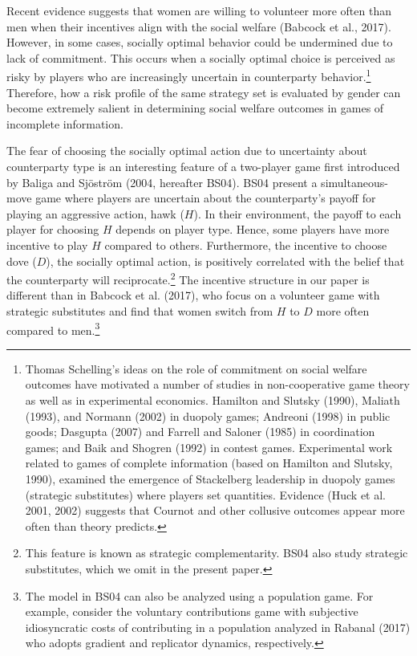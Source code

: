 \documentclass[12pt,english]{article}
\begin{document}
Recent evidence suggests that women are willing to volunteer more often than men when their incentives align with the social welfare (Babcock et al., 2017). However, in some cases, socially optimal behavior could be undermined due to lack of commitment. This occurs when a socially optimal choice is perceived as risky by players who are increasingly uncertain in counterparty behavior.\footnote{Thomas Schelling's ideas on the role of commitment on social welfare outcomes have motivated a number of studies in non-cooperative game theory as well as in experimental economics. Hamilton and Slutsky (1990), Maliath (1993), and Normann (2002) in duopoly games; Andreoni (1998) in public goods;  Dasgupta (2007) and Farrell and Saloner (1985) in coordination games; and Baik and Shogren (1992) in contest games. Experimental work related to games of complete information (based on Hamilton and Slutsky, 1990), examined the emergence of Stackelberg leadership in duopoly games (strategic substitutes) where players set quantities. Evidence (Huck et al. 2001, 2002) suggests that Cournot and other collusive outcomes appear more often than theory predicts.} Therefore, how a risk profile of the same strategy set is evaluated by gender can become extremely salient in determining social welfare outcomes in games of incomplete information.

The fear of choosing the socially optimal action due to uncertainty about counterparty type is an interesting feature of a two-player game first introduced by Baliga and Sj\"ostr\"om (2004, hereafter BS04). BS04 present a simultaneous-move game where players are uncertain about the counterparty's payoff for playing an aggressive action, hawk ($H$). In their environment, the payoff to each player for choosing $H$ depends on player type. Hence, some players have more incentive to play $H$ compared to others. Furthermore, the incentive to choose dove ($D$), the socially optimal action, is positively correlated with the belief that the counterparty will reciprocate.\footnote{This feature is known as strategic complementarity. BS04 also study strategic substitutes, which we omit in the present paper.} The incentive structure in our paper is different than in Babcock et al. (2017), who focus on a volunteer game with strategic substitutes and find that women switch from $H$ to $D$ more often compared to men.\footnote{The model in BS04 can also be analyzed using a population game. For example, consider the voluntary contributions game with subjective idiosyncratic costs of contributing in a population analyzed in Rabanal (2017) who adopts gradient and replicator dynamics, respectively.}
\end{document}
